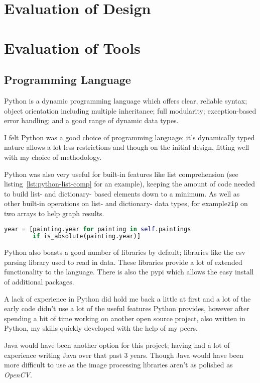 \section{Evaluation of Design}


\section{Evaluation of Tools}

\subsection{Programming Language}
Python is a dynamic programming language which offers clear, reliable syntax; object orientation
including multiple inheritance; full modularity; exception-based error handling; and a good range
of dynamic data types.

I felt Python was a good choice of programming language; it's dynamically typed nature allows a
lot less restrictions and though on the initial design, fitting well with my choice of 
methodology. 

Python was also very useful for built-in features like list comprehension (see 
listing~\ref{lst:python-list-comp} for an example), keeping the amount of code needed to build 
list- and dictionary- based elements down to a minimum. As well as other built-in operations on 
list- and dictionary- data types, for example\texttt{zip} on two arrays to help graph results.

\begin{lstlisting}[language=python,
caption={Example of List Comprehension in Python},
label=lst:python-list-comp]
year = [painting.year for painting in self.paintings 
        if is_absolute(painting.year)]
\end{lstlisting}

Python also boasts a good number of libraries by default; libraries like the \gls{csv} parsing 
library used to read in data. These libraries provide a lot of extended functionality to the 
language. There is also the \gls{pypi} which allows the easy install of 
additional packages.

A lack of experience in Python did hold me back a little at first and a lot of the early code 
didn't use a lot of the useful features Python provides, however after spending a bit of time
working on another open source project, also written in Python, my skills quickly developed with
the help of my peers.

Java would have been another option for this project; having had a lot of experience writing Java
over that past 3 years. Though Java would have been more difficult to use as the image processing
libraries aren't as polished as \emph{OpenCV}.

